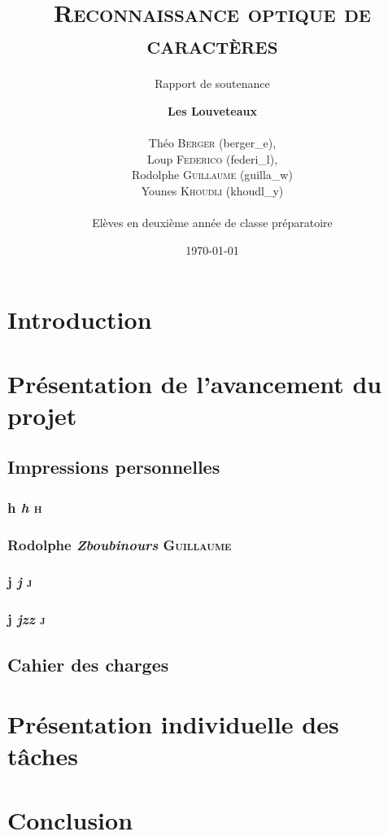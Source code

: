 \documentclass[a4paper,12pt]{article}
\title{\textsc{Reconnaissance optique de caractères}}
\subtitle{Rapport de soutenance}
\author{\textbf{Les Louveteaux} \\ \\ Théo \textsc{Berger} (berger\_e), \\ Loup \textsc{Federico} (federi\_l), \\ Rodolphe \textsc{Guillaume} (guilla\_w) \\ Younes \textsc{Khoudli} (khoudl\_y) \\ \\ \small{Elèves en deuxième année de classe préparatoire}}
\date{\today}
\begin{document}
\renewcommand{\listfigurename}{Table des illustrations}
\renewcommand{\figurename}{Illustration}
\renewcommand{\tablename}{Tableau}
\renewcommand{\contentsname}{Sommaire}


\maketitle
\thispagestyle{empty}
\newpage{}
\setcounter{page}{1}

\tableofcontents


\newpage{}
\section*{Introduction}

\section{Présentation de l'avancement du projet}

	\subsection{Impressions personnelles}
	
		\subsubsection{h \emph{h} \textsc{h}}
		
		\subsubsection{Rodolphe \emph{Zboubinours} \textsc{Guillaume}}

		\subsubsection{j \emph{j} \textsc{j}}
        
        \subsubsection{j \emph{jzz} \textsc{j}}
		
	\subsection{Cahier des charges}		
		
\section{Présentation individuelle des tâches}

\section*{Conclusion} 
	
\listoffigures
\listoftables
\end{document}
